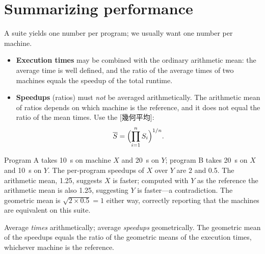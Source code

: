 \documentclass[../main.tex]{subfiles}
\begin{document}
\section{Summarizing performance}

A suite yields one number per program; we usually want one number per
machine.

\begin{itemize}
  \item \textbf{Execution times} may be combined with the ordinary
    arithmetic mean: the average time is well defined, and the ratio of the
    average times of two machines equals the speedup of the total runtime.
  \item \textbf{Speedups} (ratios) must \emph{not} be averaged
    arithmetically.  The arithmetic mean of ratios depends on which machine
    is the reference, and it does not equal the ratio of the mean times.
    Use the [幾何平均]:
    \begin{equation}
      \overline{S} = \Bigl(\prod_{i=1}^{n} S_i\Bigr)^{1/n} .
      \label{eq:geomean}
    \end{equation}
\end{itemize}

\begin{example}
  Program A takes \SI{10}{\second} on machine $X$ and \SI{20}{\second} on
  $Y$; program B takes \SI{20}{\second} on $X$ and \SI{10}{\second} on
  $Y$.  The per-program speedups of $X$ over $Y$ are 2 and 0.5.  The
  arithmetic mean, 1.25, suggests $X$ is faster; computed with $Y$ as the
  reference the arithmetic mean is also 1.25, suggesting $Y$ is faster---a
  contradiction.  The geometric mean is $\sqrt{2\times 0.5} = 1$ either way,
  correctly reporting that the machines are equivalent on this suite.
\end{example}


\begin{keypoint}
  Average \emph{times} arithmetically; average \emph{speedups}
  geometrically.  The geometric mean of the speedups equals the ratio of the
  geometric means of the execution times, whichever machine is the
  reference.
\end{keypoint}
\end{document}
